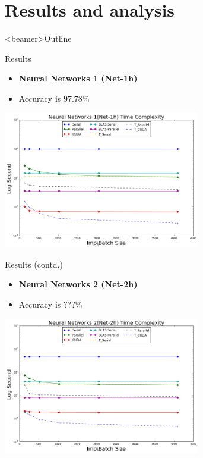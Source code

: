 \section{Results and analysis}
\begin{frame}<beamer>{Outline}
  \end{frame}
 \begin{frame}{Results}
     \begin{itemize}
         \item{ \textbf{Neural Networks 1 (Net-1h)}
         }
         \item { Accuracy is 97.78\%} 
     \end{itemize}
     
		\begin{center}
		\includegraphics[width=3.4in]{nn1_time.png}
		\end{center}

 \end{frame}
 
\begin{frame}{Results (contd.)}
     \begin{itemize}
         \item{ \textbf{Neural Networks 2 (Net-2h)}
         }
         \item { Accuracy is ???\%} 
     \end{itemize}
     
		\begin{center}
		\includegraphics[width=3.4in]{nn2_time.png}
		\end{center}

 \end{frame} 

